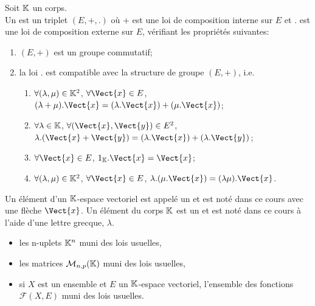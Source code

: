\documentclass{book}
\begin{document}
\begin{Definition}
Soit $\mathbb{K}$ un corps.\\
Un  est un triplet $(E,+,.)$ où
$+$ est une loi de composition interne sur $E$ et
$.$ est une loi de composition externe sur $E$,
vérifiant les propriétés suivantes:
\begin{enumerate}
\item $(E, +)$ est un groupe commutatif;
\item la loi $.$ est compatible avec la structure de groupe $(E, +)$, i.e.  
 \begin{enumerate}
  \item $\forall(\lambda ,\mu )\in\mathbb{K}^2$, $\forall \Vect{x}\in E$, $(\lambda +\mu ) . \Vect{x} = (\lambda . \Vect{x}) + (\mu . \Vect{x})$;
  \item $\forall\lambda \in\mathbb{K}$, $\forall(\Vect{x},\Vect{y})\in E^2$, $\lambda . (\Vect{x}+\Vect{y}) = (\lambda . \Vect{x}) + (\lambda . \Vect{y})$;
  \item $\forall\Vect{x}\in E$, $1_\K. \Vect{x} = \Vect{x}$;
  \item $\forall(\lambda ,\mu )\in\mathbb{K}^2$, $\forall\Vect{x}\in E$, $\lambda . (\mu . \Vect{x}) = (\lambda \mu ) . \Vect{x}$.
  \end{enumerate}
\end{enumerate}
Un élément d'un $\mathbb{K}$-espace vectoriel est appelé un  et est noté dans ce cours avec une flèche  $\Vect{x}$. Un élément du corps $\mathbb{K}$ est un  et est noté dans ce cours à l'aide d'une lettre grecque, $\lambda$.   
\end{Definition}


\begin{Exemple}

\begin{itemize}
\item les n-uplets $\mathbb{K}^n$ muni des lois usuelles, 
\item
  les matrices $\mathcal{M}_{n,p}(\mathbb{K})$ muni des lois usuelles,
\item
 si $X$ est un ensemble et $E$ un $\mathbb{K}$-espace vectoriel, l'ensemble des fonctions $\mathcal{F}(X,E)$ muni des lois usuelles.
\end{itemize}
\end{Exemple}
\end{document}
